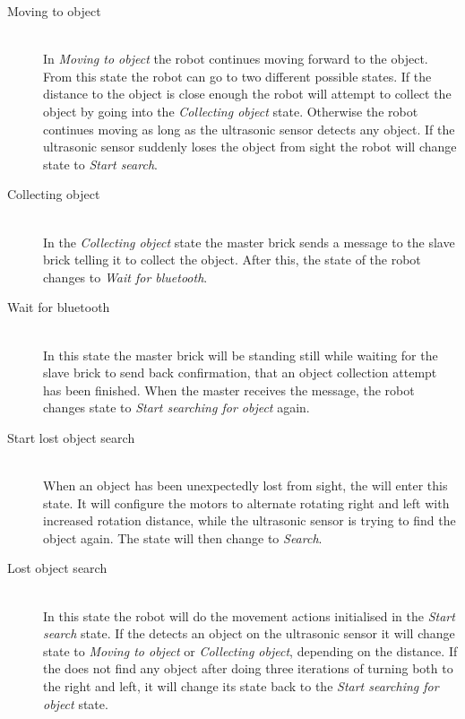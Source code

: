 \begin{description}
\item[Moving to object] \hfill \\
In \emph{Moving to object} the robot continues moving forward to the object. From this state the robot can go to two different possible states. If the distance to the object is close enough the robot will attempt to collect the object by going into the \emph{Collecting object} state. Otherwise the robot continues moving as long as the ultrasonic sensor detects any object. If the ultrasonic sensor suddenly loses the object from sight the robot will change state to \emph{Start search}.

\item[Collecting object] \hfill \\
In the \emph{Collecting object} state the master brick sends a message to the slave brick telling it to collect the object. After this, the state of the robot changes to \emph{Wait for bluetooth}.

\item[Wait for bluetooth] \hfill \\
In this state the master brick will be standing still while waiting for the slave brick to send back confirmation, that an object collection attempt has been finished. When the master receives the message, the robot changes state to \emph{Start searching for object} again. 

\item[Start lost object search] \hfill \\
When an object has been unexpectedly lost from sight, the \projname{} will enter this state. It will configure the motors to alternate rotating right and left with increased rotation distance, while the ultrasonic sensor is trying to find the object again. The state will then change to \emph{Search}.

\item[Lost object search] \hfill \\
In this state the robot will do the movement actions initialised in the \emph{Start search} state. If the \projname{} detects an object on the ultrasonic sensor it will change state to \emph{Moving to object} or \emph{Collecting object}, depending on the distance. If the \projname{} does not find any object after doing three iterations of turning both to the right and left, it will change its state back to the \emph{Start searching for object} state. 
\end{description}

